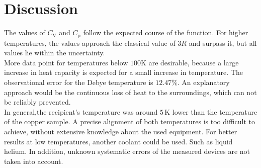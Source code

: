 \section{Discussion}
\label{sec:Diskussion}

The values of $C_\text{V}$ and $C_\text{p} $ follow the expected course of the function. 
For higher temperatures, the values approach the classical value of $3R$ and surpass it, 
but all values lie within the uncertainty. \\

More data point for temperatures below $100 \unit{\kelvin}$ are desirable, because a large increase in heat capacity is expected for a small increase in temperature.
The observational error for the Debye temperature is $12.47 \%$. 
An explanatory approach would be the continuous loss of heat to the surroundings, which can not be reliably prevented. \\

In general,the recipient's temperature was around $5 \, \unit{\kelvin}$ lower than the temperature of the copper sample.
A precise alignment of both temperatures is too difficult to achieve, without extensive knowledge about the used equipment.
For better results at low temperatures, another coolant could be used. Such as liquid helium.
In addition, unknown systematic errors of the measured devices are not taken into account.